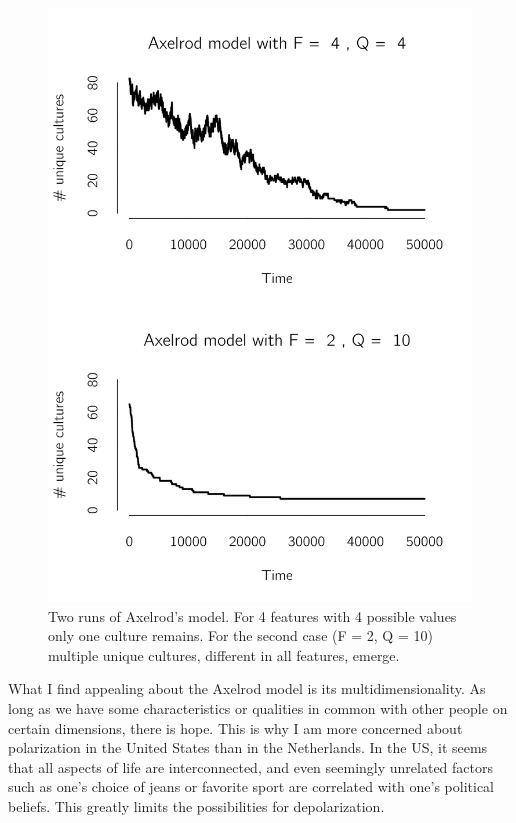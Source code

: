 \documentclass[
  a4paper,
  DIV=11,
  numbers=noendperiod]{scrreprt}
\begin{document}
\begin{figure}

{\centering \includegraphics{media/ch7/fig-ch7-img4-old-92.png}

}

\caption{\label{fig-ch7-img4-old-92}Two runs of Axelrod's model. For 4
features with 4 possible values only one culture remains. For the second
case (F = 2, Q = 10) multiple unique cultures, different in all
features, emerge.}

\end{figure}

What I find appealing about the Axelrod model is its
multidimensionality. As long as we have some characteristics or
qualities in common with other people on certain dimensions, there is
hope. This is why I am more concerned about polarization in the United
States than in the Netherlands. In the US, it seems that all aspects of
life are interconnected, and even seemingly unrelated factors such as
one's choice of jeans or favorite sport are correlated with one's
political beliefs. This greatly limits the possibilities for
depolarization.
\end{document}
